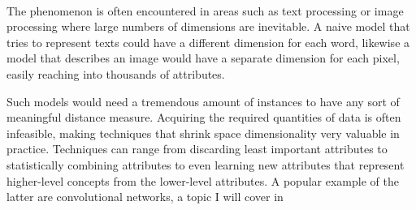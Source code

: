\paragraph{}
The phenomenon is often encountered in areas such as
text processing or image processing
where large numbers of dimensions are inevitable.
A naive model that tries to represent texts
could have a different dimension for each word,
likewise a model that describes an image
would have a separate dimension for each pixel,
easily reaching into thousands of attributes.

Such models would need a tremendous amount
of instances to have any sort of meaningful
distance measure.
Acquiring the required quantities of data
is often infeasible,
making techniques that shrink space dimensionality
very valuable in practice.
Techniques can range from discarding
least important attributes to
statistically combining attributes
to even learning new attributes that represent
higher-level concepts
from the lower-level attributes.
A popular example of the latter are
convolutional networks,
a topic I will cover in %

